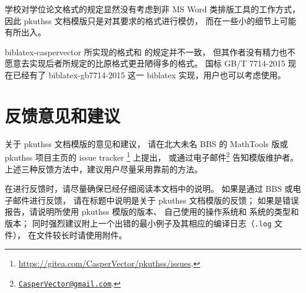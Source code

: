 学校对学位论文格式的规定显然没有考虑到非 MS Word 类排版工具的工作方式，
因此 pkuthss 文档模版只是对其要求的格式进行模仿，
而在一些小的细节上可能有所出入。

biblatex-caspervector
所实现的格式和 \parencite{pku-thesisstyle} 的规定并不一致，
但其作者没有精力也不愿意去实现后者所规定的比原格式更丑陋得多的格式。
国标 GB/T 7714-2015 现在已经有了 biblatex-gb7714-2015%
 这一 biblatex 实现，用户也可以考虑使用。

\section{反馈意见和建议}

关于 pkuthss 文档模版的意见和建议，
请在北大未名 BBS 的 MathTools 版或 pkuthss 项目主页的 issue tracker%
\footnote{\url{https://gitea.com/CasperVector/pkuthss/issues}.}%
上提出，
或通过电子邮件\footnote%
{\href{mailto:CasperVector@gmail.com}{\texttt{CasperVector@gmail.com}}.}%
告知模版维护者。
上述三种反馈方法中，建议用户尽量采用靠前的方法。

在进行反馈时，请尽量确保已经仔细阅读本文档中的说明。
如果是通过 BBS 或电子邮件进行反馈，
请在标题中说明是关于 pkuthss 文档模版的反馈；
如果是错误报告，请说明所使用 pkuthss 模版的版本、
自己使用的操作系统和  系统的类型和版本；
同时强烈建议附上一个出错的最小例子及其相应的编译日志（\verb|.log| 文件），
在文件较长时请使用附件。

